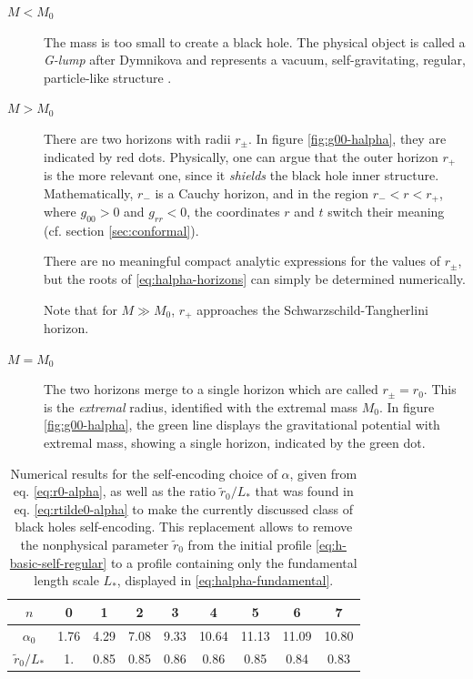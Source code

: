 \documentclass[12pt,a4paper]{report}
\numberwithin{equation}{chapter}
\begin{document}
\begin{description}
\item[$M < M_0$]
The mass is too small to create a black hole. The physical object is called a \emph{G-lump} after Dymnikova \cite{Glump} and represents a vacuum, self-gravitating, regular, particle-like structure \cite{Ansoldi2008}.

\item[$M > M_0$] There are two horizons with radii $r_\pm$. In figure \ref{fig:g00-halpha}, they are indicated by red dots. Physically, one can argue that the outer horizon $r_+$ is the more relevant one, since it \emph{shields} the black hole inner structure. Mathematically, $r_-$ is a Cauchy horizon, and in the region $r_- < r < r_+$, where $g_{00}>0$ and $g_{rr}<0$, the coordinates $r$ and $t$ switch their meaning (cf. section \ref{sec:conformal}).

There are no meaningful compact analytic expressions for the values of $r_\pm$, but the roots of \eqref{eq:halpha-horizons} can simply be determined numerically.

Note that for $M \gg M_0$, $r_+$ approaches the Schwarzschild-Tangherlini horizon.

\item[$M = M_0$]
The two horizons merge to a single horizon which are called $r_\pm = r_0$. This is the \emph{extremal} radius, identified with the extremal mass $M_0$. In figure \ref{fig:g00-halpha}, the green line displays the gravitational potential with extremal mass, showing a single horizon, indicated by the green dot.
\end{description}


\begin{table}
\begin{center}
\begin{tabular}{ccccccccc}
\firsthline
   $n$ & 0 & 1 & 2 & 3 & 4 & 5 & 6 & 7 \\
   \hline
 $\alpha_0$  & 1.76 & 4.29 & 7.08 & 9.33 &
   10.64 & 11.13 & 11.09 & 10.80 \\
  $\tilde r_0 / L_*$ & 1. & 0.85 & 0.85 & 0.86 & 0.86 &
   0.85 & 0.84 & 0.83 \\
   \hline
\end{tabular}
\end{center}
\caption[Length and mass scales of the smeared black holes in higher dimensions]{Numerical results for the self-encoding choice of $\alpha$, given from eq. \eqref{eq:r0-alpha}, as well as the ratio $\tilde r_0/L_*$ that was found in eq. \eqref{eq:rtilde0-alpha} to make the currently discussed class of black holes self-encoding. This replacement allows to remove the nonphysical parameter $\tilde r_0$ from the initial profile \eqref{eq:h-basic-self-regular} to a profile containing only the fundamental length scale $L_*$, displayed in \eqref{eq:halpha-fundamental}. 
}\label{table:halpha-length-scales}
\end{table}
%
\end{document}
